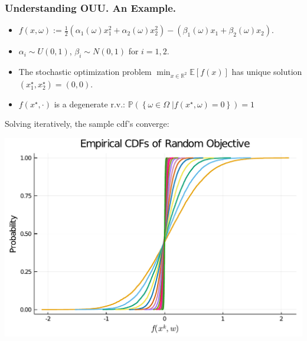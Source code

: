 \documentclass[aspectratio=169,xcolor=dvipsnames,10pt]{beamer}
\begin{document}
\begin{frame}\frametitle{Understanding OUU. An Example.}
\begin{exampleblock}{}
\begin{itemize}
\item $f(x,\omega) := \frac{1}{2}(\alpha_1(\omega) x_1^2 + \alpha_2(\omega) x_2^2) - (\beta_1(\omega) x_1 + \beta_2(\omega) x_2).$
\item $\alpha_i \sim U(0,1)$, $\beta_i \sim N(0,1)$ for $i=1,2$.
\item The stochastic optimization problem 
$
\min_{x \in \mathbb R^2 } \mathbb E[f(x)]
$
has unique solution $(x^{\star}_1,x^{\star}_2) = (0,0)$. 
\item $f(x^{\star},\cdot)$ is a degenerate r.v.: $\mathbb P(\left\{\omega \in \Omega \; \left| f(x^{\star},\omega) = 0\right.\right\}) = 1$
\end{itemize}
\begin{center}
    \begin{minipage}{0.6\textwidth}
        Solving iteratively, the sample cdf's converge:
    \end{minipage}
    \begin{minipage}{5cm}
        \includegraphics[width=\textwidth, keepaspectratio]{Part I/figures/empirical_cdfs_obj.pdf}
    \end{minipage}
\end{center}

\end{exampleblock}
\end{frame}
\end{document}
